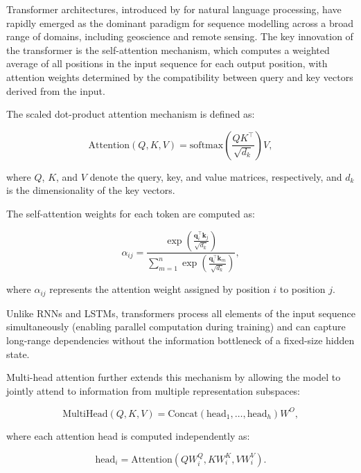 \documentclass[land,article,submit,pdftex,moreauthors]{Definitions/mdpi}
\numberwithin{equation}{section}
\begin{document}
Transformer architectures, introduced by \citet{Vaswani2017} for natural language processing, have rapidly emerged as the dominant paradigm for sequence modelling across a broad range of domains, including geoscience and remote sensing. The key innovation of the transformer is the self-attention mechanism, which computes a weighted average of all positions in the input sequence for each output position, with attention weights determined by the compatibility between query and key vectors derived from the input.

The scaled dot-product attention mechanism is defined as:

\begin{equation}
\text{Attention}(Q,K,V)
=
\text{softmax}
\left(
\frac{QK^\top}{\sqrt{d_k}}
\right)V,
\end{equation}

where $Q$, $K$, and $V$ denote the query, key, and value matrices, respectively, and $d_k$ is the dimensionality of the key vectors.

The self-attention weights for each token are computed as:

\begin{equation}
\alpha_{ij}
=
\frac{
\exp \left(
\frac{\mathbf{q}_i^\top \mathbf{k}_j}{\sqrt{d_k}}
\right)
}{
\sum_{m=1}^{n}
\exp \left(
\frac{\mathbf{q}_i^\top \mathbf{k}_m}{\sqrt{d_k}}
\right)
},
\end{equation}

where $\alpha_{ij}$ represents the attention weight assigned by position $i$ to position $j$.

Unlike RNNs and LSTMs, transformers process all elements of the input sequence simultaneously (enabling parallel computation during training) and can capture long-range dependencies without the information bottleneck of a fixed-size hidden state.

Multi-head attention further extends this mechanism by allowing the model to jointly attend to information from multiple representation subspaces:

\begin{equation}
\text{MultiHead}(Q,K,V)
=
\text{Concat}
(\text{head}_1,\dots,\text{head}_h)W^O,
\end{equation}

where each attention head is computed independently as:

\begin{equation}
\text{head}_i
=
\text{Attention}
(QW_i^Q,KW_i^K,VW_i^V).
\end{equation}
\end{document}
